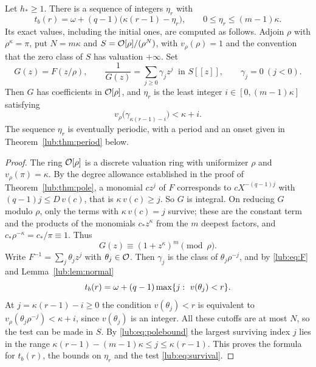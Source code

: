 \begin{theorem}\label{lub:thm:defect}
Let $h_*\ge1$. There is a sequence of integers $\eta_r$ with
\[
 t_b(r)=\omega+(q-1)\bigl(\kappa(r-1)-\eta_r\bigr),\qquad 0\le\eta_r\le(m-1)\kappa .
\]
Its exact values, including the initial ones, are computed as follows. Adjoin $\rho$ with
$\rho^{\kappa}=\pi$, put $N=m\kappa$ and $S=\mathcal{O}[\rho]/(\rho^N)$, with $v_\rho(\rho)=1$ and
the convention that the zero class of $S$ has valuation $+\infty$. Set
\[
 G(z)=F(z/\rho),\qquad \frac1{G(z)}=\sum_{j\ge0}\gamma_jz^j\ \text{ in }S[[z]],\qquad
 \gamma_j=0\ (j<0).
\]
Then $G$ has coefficients in $\mathcal{O}[\rho]$, and $\eta_r$ is the least integer
$i\in[0,(m-1)\kappa]$ satisfying
\begin{equation}\label{lub:eq:survival}
 v_\rho\bigl(\gamma_{\kappa(r-1)-i}\bigr)<\kappa+i .
\end{equation}
The sequence $\eta_r$ is eventually periodic, with a period and an onset given in
Theorem~\ref{lub:thm:period} below.
\end{theorem}
\begin{proof}
The ring $\mathcal{O}[\rho]$ is a discrete valuation ring with uniformizer $\rho$ and
$v_\rho(\pi)=\kappa$. By the degree allowance established in the proof of
Theorem~\ref{lub:thm:pole}, a monomial $cz^j$ of $F$ corresponds to $cX^{-(q-1)j}$ with
$(q-1)j\le D\,v(c)$, that is $\kappa\,v(c)\ge j$. So $G$ is integral. On reducing $G$
modulo $\rho$, only the terms with $\kappa\,v(c)=j$ survive; these are the constant term
and the products of the monomials $c_*z^{\kappa}$ from the $m$ deepest factors, and
$c_*\rho^{-\kappa}=c_*/\pi\equiv1$. Thus
\begin{equation}\label{lub:eq:Gmod}
 G(z)\equiv(1+z^{\kappa})^m\pmod\rho .
\end{equation}
Write $F^{-1}=\sum_j\theta_jz^j$ with $\theta_j\in\mathcal{O}$. Then $\gamma_j$ is the class of
$\theta_j\rho^{-j}$, and by \eqref{lub:eq:F} and Lemma~\ref{lub:lem:normal}
\[
 t_b(r)=\omega+(q-1)\max\set{j:\ v(\theta_j)<r}.
\]
At $j=\kappa(r-1)-i\ge0$ the condition $v(\theta_j)<r$ is equivalent to
$v_\rho(\theta_j\rho^{-j})<\kappa+i$, since $v(\theta_j)$ is an integer. All these cutoffs
are at most $N$, so the test can be made in $S$. By \eqref{lub:eq:polebound} the largest
surviving index $j$ lies in the range $\kappa(r-1)-(m-1)\kappa\le j\le\kappa(r-1)$. This
proves the formula for $t_b(r)$, the bounds on $\eta_r$ and the test \eqref{lub:eq:survival}.
\end{proof}


